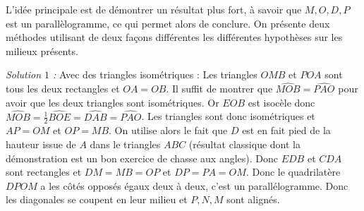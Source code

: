 \begin{sol}
\begin{center}
\end{center}

L'idée principale est de démontrer un résultat plus fort, à savoir que $M,O,D,P$ est un parallèlogramme, ce qui permet alors de conclure. On présente deux méthodes utilisant de deux façons différentes les différentes hypothèses sur les milieux présents.

\textit{Solution $1$ :} Avec des triangles isométriques :
Les triangles $OMB$ et $POA$ sont tous les deux rectangles et $OA=OB$. Il suffit de montrer que $\widehat{MOB}=\widehat{PAO}$ pour avoir que les deux triangles sont isométriques.
Or $EOB$ est isocèle donc $\widehat{MOB}=\frac 12\widehat{BOE}=\widehat{DAB}=\widehat{PAO}$. Les triangles sont donc isométriques et $AP=OM$ et $OP=MB$.
On utilise alors le fait que $D$ est en fait pied de la hauteur issue de $A$ dans le triangles $ABC$ (résultat classique dont la démonstration est un bon exercice de chasse aux angles). Donc $EDB$ et $CDA$ sont rectangles et $DM=MB=OP$ et $DP=PA=OM$. Donc le quadrilatère $DPOM$ a les côtés opposés égaux deux à deux, c'est un parallélogramme. Donc les diagonales se coupent en leur milieu et $P,N,M$ sont alignés.


\end{sol}
